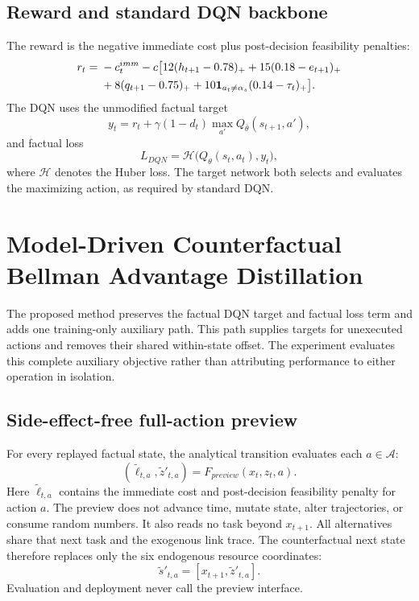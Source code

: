 \documentclass[11pt]{article}
\begin{document}
\subsection{Reward and standard DQN backbone}

The reward is the negative immediate cost plus post-decision feasibility penalties:
\begin{align}
r_t={}&-c_t^{imm}-c\big[12(h_{t+1}-0.78)_+ +15(0.18-e_{t+1})_+\notag\\
&+8(q_{t+1}-0.75)_+ +10\mathbf 1_{a_t\ne\alpha_s}(0.14-\tau_t)_+\big].
\label{eq:reward}
\end{align}
The DQN uses the unmodified factual target
\begin{equation}
y_t=r_t+\gamma(1-d_t)\max_{a'}Q_{\bar\theta}(s_{t+1},a'),
\label{eq:factual}
\end{equation}
and factual loss
\begin{equation}
L_{DQN}=\mathcal H\big(Q_\theta(s_t,a_t),y_t\big),
\end{equation}
where $\mathcal H$ denotes the Huber loss. The target network both selects and evaluates the maximizing action, as required by standard DQN.

\section{Model-Driven Counterfactual Bellman Advantage Distillation}
\label{sec:method}

The proposed method preserves the factual DQN target and factual loss term and adds one training-only auxiliary path. This path supplies targets for unexecuted actions and removes their shared within-state offset. The experiment evaluates this complete auxiliary objective rather than attributing performance to either operation in isolation.

\subsection{Side-effect-free full-action preview}

For every replayed factual state, the analytical transition evaluates each $a\in\mathcal A$:
\begin{equation}
(\tilde \ell_{t,a},\tilde z'_{t,a})=F_{preview}(x_t,z_t,a).
\end{equation}
Here $\tilde \ell_{t,a}$ contains the immediate cost and post-decision feasibility penalty for action $a$. The preview does not advance time, mutate state, alter trajectories, or consume random numbers. It also reads no task beyond $x_{t+1}$. All alternatives share that next task and the exogenous link trace. The counterfactual next state therefore replaces only the six endogenous resource coordinates:
\begin{equation}
\tilde s'_{t,a}=[x_{t+1},\tilde z'_{t,a}].
\end{equation}
Evaluation and deployment never call the preview interface.
\end{document}
